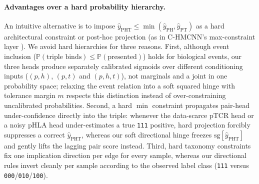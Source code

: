 \documentclass[webpdf,modern,large,namedate]{oup-authoring-template}
\theoremstyle{thmstyleone}
\theoremstyle{thmstyletwo}
\theoremstyle{thmstylethree}
\newcommand{\PH}{pHLA}
\newcommand{\PT}{pTCR}
\newcommand{\PHm}{\mathrm{PH}}
\newcommand{\PTm}{\mathrm{PT}}
\newcommand{\PHTm}{\mathrm{PHT}}
\newcommand{\sg}{\mathrm{sg}}
\begin{document}
\paragraph{Advantages over a hard probability hierarchy.}
An intuitive alternative is to impose $\hat y_{\PHTm}\le\min(\hat y_{\PHm},
\hat y_{\PTm})$ as a hard architectural constraint or post-hoc projection (as
in C-HMCNN's max-constraint layer \citep{giunchiglia2020chmcnn}). We avoid hard
hierarchies for three reasons. First, although event inclusion
($\mathbb{P}(\text{triple binds})\le\mathbb{P}(\text{presented})$) holds for
biological events, our three heads produce separately calibrated sigmoids over
different conditioning inputs ($(p,h)$, $(p,t)$ and $(p,h,t)$), not marginals
and a joint in one probability space; relaxing the event relation into a soft
squared hinge with tolerance margin $m$ respects this distinction instead of
over-constraining uncalibrated probabilities. Second, a hard $\min$ constraint
propagates pair-head under-confidence directly into the triple: whenever the
data-scarce \PT{} head or a noisy \PH{} head under-estimates a true
\texttt{111} positive, hard projection forcibly suppresses a correct
$\hat y_{\PHTm}$, whereas our soft directional hinge freezes
$\sg[\hat y_{\PHTm}]$ and gently lifts the lagging pair score instead. Third,
hard taxonomy constraints fix one implication direction per edge for every
sample, whereas our directional rules invert cleanly per sample according to
the observed label class (\texttt{111} versus \texttt{000}/\texttt{010}/\texttt{100}).
\end{document}
